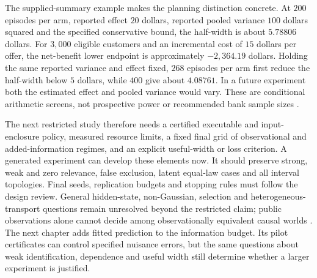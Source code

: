 The supplied-summary example makes the planning distinction concrete.
At $200$ episodes per arm, reported effect $20$ dollars, reported
pooled variance $100$ dollars squared and the specified conservative
bound, the half-width is about $5.78806$ dollars. For $3{,}000$
eligible customers and an incremental cost of $15$ dollars per offer,
the net-benefit lower endpoint is approximately $-2{,}364.19$ dollars.
Holding the same reported variance and effect fixed, $268$ episodes
per arm first reduce the half-width below $5$ dollars, while $400$
give about $4.08761$. In a future experiment both the estimated effect
and pooled variance would vary. These are conditional arithmetic
screens, not prospective power or recommended bank sample sizes
\citep{exec13_temporal_design}.

The next restricted study therefore needs a certified executable and
input-enclosure policy, measured resource limits, a fixed final grid
of observational and added-information regimes, and an explicit
useful-width or loss criterion. A generated experiment can develop
these elements now. It should preserve strong, weak and zero relevance,
false exclusion, latent equal-law cases and all interval topologies.
Final seeds, replication budgets and stopping rules must follow the
design review. General hidden-state, non-Gaussian, selection and
heterogeneous-transport questions remain unresolved beyond the
restricted claim; public observations alone cannot decide among
observationally equivalent causal worlds
\citep{exec13_temporal_design}. The next chapter adds fitted prediction to the information budget. Its pilot certificates can control specified nuisance errors, but the same questions about weak identification, dependence and useful width still determine whether a larger experiment is justified.
\label{exec13:temporal-design-review-end}

